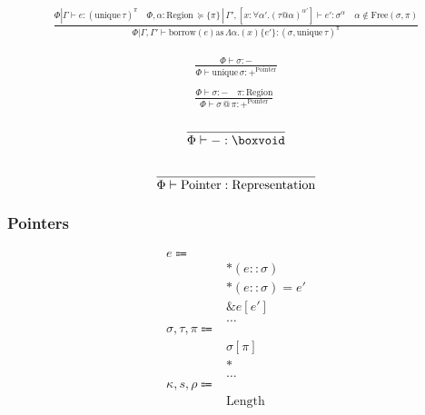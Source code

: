 \documentclass {article}
\begin{document}
\begin{gather*}
\frac
{\Phi | \Gamma \vdash e : (\text{unique} \, \tau)^\pi \quad \Phi,\alpha : \text{Region} \, \succeq \{ \pi \} \, | \, \Gamma', [x : \forall \alpha'. (\tau @ \alpha)^{\alpha'}] \vdash e' : \sigma^\alpha \quad \alpha \notin \text{Free}(\sigma, \pi)}
{\Phi | \Gamma, \Gamma' \vdash \text{borrow} (e) \text{as} \, \Lambda \alpha. (x) \{ e' \} : (\sigma, \text{unique} \, \tau)^\pi }
\end{gather*}

\begin{gather*}
\frac
{\Phi \vdash \sigma : -}
{\Phi \vdash \text{unique} \, \sigma : +^\text{Pointer}} \\
\\
\frac
{\Phi \vdash \sigma : - \quad \pi : \text{Region}}
{\Phi \vdash \sigma \, @ \, \pi : +^\text{Pointer}} 
\end{gather*}

\begin{gather*}
\frac
{}
{\Phi \vdash - : \boxvoid} \\
\\
\frac
{}
{\Phi \vdash \text{Pointer} : \text{Representation}} \\
\end{gather*}

\subsubsection{Pointers}
\begin{align*}
e \Coloneqq & \\
& *(e :: \sigma) \tag{Read Pointer} \\
& *(e :: \sigma) = e' \tag{Write Pointer} \\
& \& e [e'] \tag{Pointer Increment} \\
& \dots \\
\sigma, \tau, \pi \Coloneqq & \\
& \sigma [\pi] \tag{Pointer} \\
& * \tag{Unknown Length} \\
& \dots \\
\kappa, s, \rho \Coloneqq & \\
& \text{Length}
\end{align*}
\end{document}
